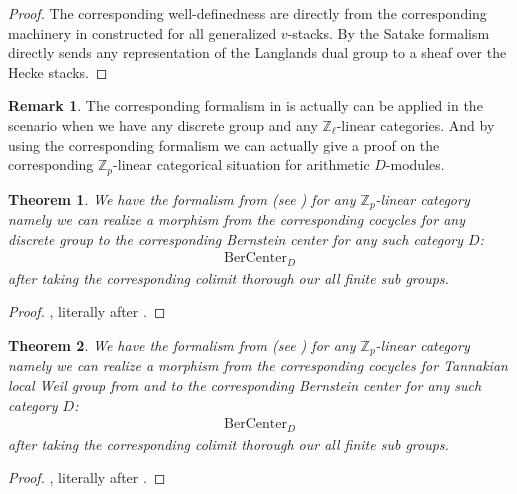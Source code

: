 \documentclass[12pt]{book}
\newtheorem{theorem}{Theorem}
\theoremstyle{definition}
\newtheorem{remark}{Remark}
\begin{document}
\begin{proof}
The corresponding well-definedness are directly from the corresponding machinery in \cite{AI} constructed for all generalized $v$-stacks. By \cite[Section 3]{XZ} the Satake formalism directly sends any representation of the Langlands dual group to a sheaf over the Hecke stacks.
 \end{proof}


\begin{remark}
The corresponding formalism in \cite[Chapter VIII Theorem 4.1, Chapter IX Proposition 4.1, and the proof]{FS} is actually can be applied in the scenario when we have any discrete group and any $\mathbb{Z}_\ell$-linear categories. And by using the corresponding formalism we can actually give a proof on the corresponding $\mathbb{Z}_p$-linear categorical situation for arithmetic $D$-modules.
\end{remark}


\begin{theorem}
We have the formalism from \cite{VLa} (see \cite[Chapter VIII Theorem 4.1 and Chapter IX Proposition 4.1]{FS}) for any $\mathbb{Z}_p$-linear category namely we can realize a morphism from the corresponding cocycles for any discrete group to the corresponding Bernstein center for any such category $D$:
\begin{align}
\mathrm{BerCenter}_D
\end{align}
after taking the corresponding colimit thorough our all finite sub groups. 
\end{theorem}

\begin{proof}
\cite[Chapter VIII Theorem 4.1 and Chapter IX Proposition 4.1]{FS}, literally after \cite{VLa}.
\end{proof}

\begin{theorem}
We have the formalism from \cite{VLa} (see \cite[Chapter VIII Theorem 4.1 and Chapter IX Proposition 4.1]{FS}) for any $\mathbb{Z}_p$-linear category namely we can realize a morphism from the corresponding cocycles for Tannakian local Weil group from \cite{AI} and \cite{KXII} to the corresponding Bernstein center for any such category $D$:
\begin{align}
\mathrm{BerCenter}_D
\end{align}
after taking the corresponding colimit thorough our all finite sub groups. 
\end{theorem}

\begin{proof}
\cite[Chapter VIII Theorem 4.1 and Chapter IX Proposition 4.1]{FS}, literally after \cite{VLa}.
\end{proof}
\end{document}
